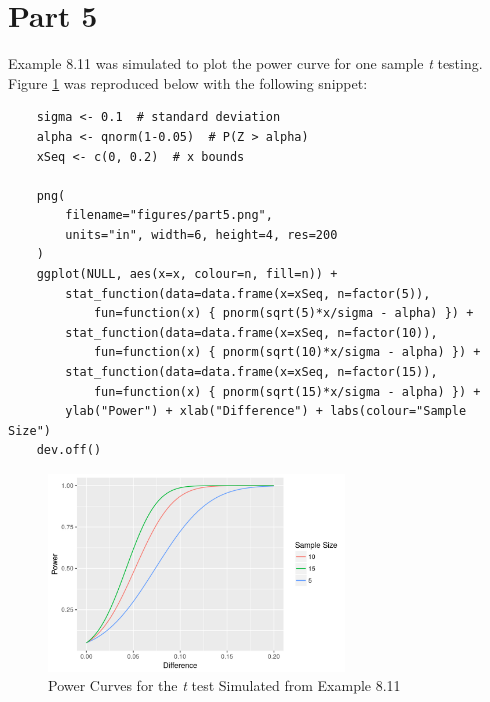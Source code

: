 \section{Part 5}
Example 8.11 was simulated to plot the power curve for one sample \textit{t} testing. Figure \ref{fig:part5} was reproduced below with the following snippet:

\begin{lstlisting}
    sigma <- 0.1  # standard deviation
    alpha <- qnorm(1-0.05)  # P(Z > alpha)
    xSeq <- c(0, 0.2)  # x bounds

    png(
        filename="figures/part5.png", 
        units="in", width=6, height=4, res=200
    )
    ggplot(NULL, aes(x=x, colour=n, fill=n)) +
        stat_function(data=data.frame(x=xSeq, n=factor(5)), 
            fun=function(x) { pnorm(sqrt(5)*x/sigma - alpha) }) +
        stat_function(data=data.frame(x=xSeq, n=factor(10)), 
            fun=function(x) { pnorm(sqrt(10)*x/sigma - alpha) }) +
        stat_function(data=data.frame(x=xSeq, n=factor(15)), 
            fun=function(x) { pnorm(sqrt(15)*x/sigma - alpha) }) + 
        ylab("Power") + xlab("Difference") + labs(colour="Sample Size")
    dev.off()
\end{lstlisting}


    \begin{figure}[ht]
        \begin{center}
            \includegraphics[width=0.7\textwidth]{figures/part5.png}
            \caption{Power Curves for the \textit{t} test Simulated from Example 8.11} \label{fig:part5}
        \end{center}
    \end{figure}
